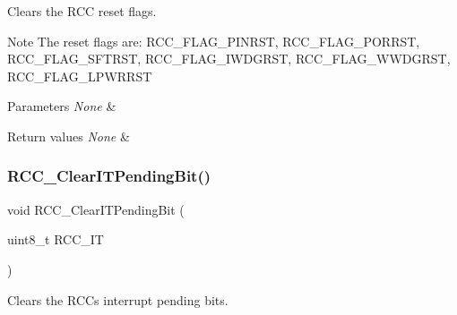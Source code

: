 Clears the R\+CC reset flags. 

\begin{DoxyNote}{Note}
The reset flags are\+: R\+C\+C\+\_\+\+F\+L\+A\+G\+\_\+\+P\+I\+N\+R\+ST, R\+C\+C\+\_\+\+F\+L\+A\+G\+\_\+\+P\+O\+R\+R\+ST, R\+C\+C\+\_\+\+F\+L\+A\+G\+\_\+\+S\+F\+T\+R\+ST, R\+C\+C\+\_\+\+F\+L\+A\+G\+\_\+\+I\+W\+D\+G\+R\+ST, R\+C\+C\+\_\+\+F\+L\+A\+G\+\_\+\+W\+W\+D\+G\+R\+ST, R\+C\+C\+\_\+\+F\+L\+A\+G\+\_\+\+L\+P\+W\+R\+R\+ST 
\end{DoxyNote}

\begin{DoxyParams}{Parameters}
{\em None} & \\
\hline
\end{DoxyParams}

\begin{DoxyRetVals}{Return values}
{\em None} & \\
\hline
\end{DoxyRetVals}
\mbox{\label{group___r_c_c___exported___functions_ga529842d165910f8f87e26115da36089b}} 
\subsubsection{\texorpdfstring{RCC\_ClearITPendingBit()}{RCC\_ClearITPendingBit()}}
{\footnotesize\ttfamily void R\+C\+C\+\_\+\+Clear\+I\+T\+Pending\+Bit (\begin{DoxyParamCaption}\item[{uint8\+\_\+t}]{R\+C\+C\+\_\+\+IT }\end{DoxyParamCaption})}



Clears the R\+CC\textquotesingle{}s interrupt pending bits. 


